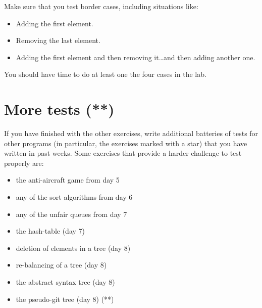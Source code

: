 \documentclass{article}
\begin{document}
Make sure that you test border cases, including situations like: 

\begin{itemize}
\item Adding the first element.
\item Removing the last element.
\item Adding the first element and then removing it\ldots and then
  adding another one.
\end{itemize}

You should have time to do at least one the four cases in the lab.

\section{More tests (**)}
\label{sec:more-tests-}

If you have finished with the other exercises, write additional
batteries of tests for other programs (in particular, the exercises
marked with a star)  that you have written in past
weeks. Some exercises that provide a harder challenge to test properly
are: 

\begin{itemize}
\item the anti-aircraft game from day 5
\item any of the sort algorithms from day 6
\item any of the unfair queues from day 7
\item the hash-table (day 7)
\item deletion of elements in a tree (day 8)
\item re-balancing of a tree (day 8)
\item the abstract syntax tree (day 8)
\item the pseudo-git tree (day 8) (**)
\end{itemize}
\end{document}
